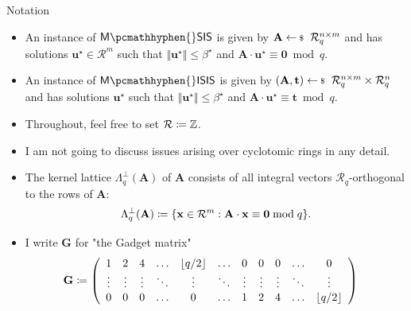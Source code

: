 \documentclass[xcolor=table,10pt,aspectratio=169]{beamer}
\renewcommand{\vec}[1]{\ensuremath{\mathbf{#1}}\xspace}
\providecommand{\mat}[1]{\ensuremath{\vec{#1}}\xspace}
\providecommand{\ring}[0]{\ensuremath{\mathcal{R}}\xspace}
\newcommand{\MSIS}{\ensuremath{\mathsf{M}\pcmathhyphen{}\mathsf{SIS}}\xspace}
\newcommand{\MISIS}{\ensuremath{\mathsf{M}\pcmathhyphen{}\mathsf{ISIS}}\xspace}
\begin{document}
\begin{frame}[allowframebreaks]{Notation}
\begin{definition}[M-(I)SIS]
\begin{itemize}
\item An instance of \(\MSIS\) is given by \(\mat{A} \sample \ring_q^{n\times m}\) and has solutions \(\vec{u}^{\star} \in \ring^{m}\) such that \(\Vert \vec{u}^{\star} \Vert \leq \beta^{\star}\) and \(\mat{A} \cdot \vec{u}^{\star} \equiv \vec{0} \bmod q\).
\item An instance of \(\MISIS\) is given by \((\mat{A}, \vec{t}) \sample \ring_q^{n\times m} \times \ring_q^n\) and has solutions \(\vec{u}^{\star}\) such that \(\Vert \vec{u}^{\star} \Vert \leq \beta^{\star}\) and \(\mat{A} \cdot \vec{u}^{\star} \equiv \vec{t} \bmod q\).
\end{itemize}
\label{def:sis}
\end{definition}

\begin{itemize}
\item Throughout, feel free to set \(\ring \coloneqq \ZZ\).
\item I am not going to discuss issues arising over cyclotomic rings in any detail.
\end{itemize}

\framebreak

\begin{itemize}
\item The kernel lattice \(\Lambda_q^\bot(\mat{A})\) of \(\mat{A}\) consists of all integral vectors \(\ring_q\)-orthogonal to the rows of \(\mat{A}\):
\[\Lambda_q^\bot(\mat{A}) \coloneqq \set{ \vec{x} \in \ring^m : \mat{A} \cdot \vec{x} \equiv \vec{0} \bmod q }.\]
\item I write \(\mat{G}\) for "the Gadget matrix"
\begin{align*}
\mat{G} &\coloneqq
\left(\begin{array}{*{20}c}
1 & 2 & 4 & \ldots & \lfloor q/2 \rfloor & \ldots & 0 & 0 & 0 & \ldots & 0 \\
\vdots & \vdots & \vdots & \ddots & \vdots       & \ddots & \vdots & \vdots & \vdots & \ddots & \vdots \\
0 & 0 & 0  & \ldots& 0       & \ldots & 1 & 2 & 4 & \ldots & \lfloor q/2 \rfloor \\
\end{array}\right)
\end{align*}
\end{itemize}
\end{frame}
\end{document}
